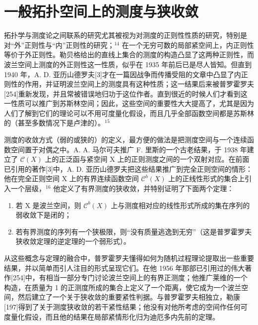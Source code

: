 \section*{一般拓扑空间上的测度与狭收敛}
{}

拓扑学与测度论之间联系的研究尤其被视为对测度的正则性性质的研究，特别是对“外”正则性与“内”正则性的研究；\(^{14}\) 在一个无穷可数的局部紧空间上，内正则性等价于外正则性。勒贝格给出的直线上集合的测度的构造凸显了这两种正则性，而波兰空间上测度的外正则性这一性质，似乎在 1935 年前后已是尽人皆知。但直到 1940 年，A. D. 亚历山德罗夫{[}3{]}才在一篇因战争而传播受阻的文章中凸显了内正则性的作用，并证明波兰空间上的测度具有这种性质；这一结果后来被普罗霍罗夫{[}254{]}重新发现，并且常被错误地归功于这位作者。直到很近的时候人们才看到这一性质可以推广到苏斯林空间；因此，这些空间的重要性大大提高了，尤其是因为人们了解到它们的理论可以不用可度量化假设，而且几乎全部函数空间都是苏斯林的（甚至多数情况下是卢津的）。\(^{15}\)

测度的收敛方式（弱的或狭的）的定义，最方便的做法是把测度空间与一个连续函数空间置于对偶之中。A. A. 马尔可夫推广 F. 里斯的一个古老结果，于 1938 年建立了 \(\mathcal{C}(X)\) 上的正泛函与紧空间 X 上的正则测度之间的一个双射对应。在前面已引用的著作{[}3{]}中，A. D. 亚历山德罗夫把这些结果推广到完全正则空间的情形：他在完全正则空间 X 上的有界连续函数空间 \(\mathcal{C}^{b}(X)\) 上的正线性形式的集合上引入一个层级，\(^{16}\) 他定义了有界测度的狭收敛，并特别证明了下面两个定理：

\begin{enumerate}
\def\labelenumi{\alph{enumi})}
\item
  若 X 是波兰空间，则 \(\mathcal{C}^{b}(X)\) 上与测度相对应的线性形式所成的集在序列的弱收敛下是闭的；
\item
  若有界测度的序列有一个狭极限，则“没有质量逃逸到无穷”（这是普罗霍罗夫狭收敛定理的逆定理的一个弱形式）。
\end{enumerate}

从这些概念与定理的融合中，普罗霍罗夫懂得如何为随机过程理论提取出一些重要结果，并以简单而引人注目的形式呈现它们。在他 1956 年那部已引用过的伟大著作{[}254{]}中，有相当一部分专门讨论波兰空间上的有界正测度；他推广莱维的一个构造，在质量为 1 的正测度所成的集合上定义了一个距离，使它成为一个波兰空间，然后建立了一个关于狭收敛的重要紧性判据。与普罗霍罗夫相独立，勒康{[}197{]}得到了关于测度狭收敛的若干紧性结果；他没有对他所考虑的空间作任何可度量化假设，而且他的结果在局部紧情形化归为迪厄多内先前的定理。


